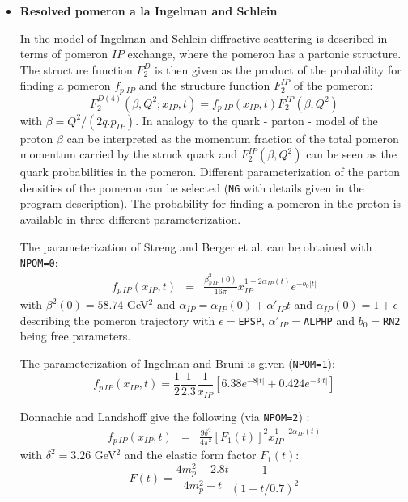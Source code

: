 \documentclass[10pt]{article} \usepackage{dina4}
\newcommand{\PO}{\ensuremath{ I\! \! P} }
\newcommand{\pom}{I\!\!P}
\newcommand{\xpom}{x_{\pom}}
\begin{document}
\begin{itemize}

\item {\bf Resolved pomeron a la Ingelman and Schlein} 

In the model of Ingelman and Schlein \cite{IS}
diffractive scattering is described in terms of pomeron $\PO$ exchange, where
the pomeron has a partonic structure. The structure function
$F_2^D$ is then given as the product
of the probability for finding a pomeron $f_{p\;\PO}$ and the
structure function $F_2^{\PO}$ of the pomeron:
\begin{equation}
F_2^{D(4)}(\beta,Q^2;\xpom,t) = f_{p\;\PO}(\xpom,t)  F_2^{\PO}(\beta,Q^2)
\label{F2Ddef}
\end{equation}
with $\beta=Q^2/(2q.p_{\PO})$. 
In analogy to the quark - parton - model of the proton
$\beta$ can be interpreted as the momentum fraction of the total
pomeron momentum carried by the struck quark and
$ F_2^{\PO}(\beta,Q^2)$  can be seen as the
quark probabilities in the
pomeron.
Different parameterization of the 
parton densities of the pomeron can be selected (\verb+NG+ with details
given in the program description). 
The probability for finding a pomeron in the 
proton is available in three different parameterization.
\par
The parameterization of Streng and Berger et al. 
\cite{Strenga,Strengb,Berger_Collins}
 can be obtained with  \verb+NPOM=0+:
\begin{eqnarray}
f_{p\,\PO} (\xpom,t) & = & \frac{\beta^2_{p \, \PO} (0) }{16 \pi}
 \xpom^{1 - 2 \alpha_{\PO} (t)} e^{-b_0 |t|} 
\end{eqnarray}
with $\beta^2 (0) = 58.74$ GeV$^2$  and 
$\alpha_{\PO} =  \alpha_{\PO}(0) + \alpha'_{\PO} t$ and
$\alpha_{\PO}(0) = 1 + \epsilon$ describing the pomeron trajectory 
with $\epsilon=$\verb+EPSP+, $\alpha'_{\PO}=$\verb+ALPHP+
and $b_0=$\verb+RN2+ being  free parameters.
\par
The parameterization of Ingelman and Bruni 
\cite{Ingelman_Brunia,Ingelman_Brunib,Ingelman_Brunic}
 is given (\verb+NPOM=1+):
\begin{equation}
f _{p\,\PO} (\xpom,t) = \frac{1}{2}\frac{1}{2.3}
                             \frac{1}{\xpom}\left[6.38 e^{-8|t|}
                                      + 0.424 e^{-3|t|} \right]
\end{equation}
\par
Donnachie and Landshoff \cite{DL_84} 
give the following (via \verb+NPOM=2+) :
\begin{eqnarray}
f _{p\,\PO} (\xpom,t) & = & \frac{9 \delta ^2}{4 \pi ^2} 
       \left[F_1(t)\right]^2
                   \xpom^{1 - 2 \alpha_{\PO}(t)}
\end{eqnarray}
with $\delta^2 = 3.26$ GeV$^2$ and the elastic form factor $F_1(t)$:
\begin{equation}
F(t) =        \frac{4 m_p ^2 - 2.8 t}{4 m_p ^2 - t}
                   \frac{1}{(1 - t/0.7)^2}
\end{equation}


\end{itemize}
\end{document}
